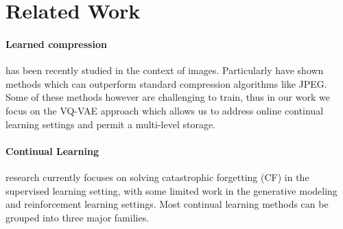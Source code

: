 \documentclass[colorinlistoftodos]{article} %
\begin{document}
				

 



\section{Related Work}

\paragraph{Learned compression} has been recently studied in the context of images. Particularly \citet{theis2017lossy,balle2016end,johnston2018improved} have shown methods which can outperform standard compression algorithms like JPEG. Some of these methods however are challenging to train, thus in our work we focus on the VQ-VAE approach \cite{van2017neural,razavi2019generating} which allows us to address online continual learning settings and permit a multi-level storage. 

\paragraph{Continual Learning} research currently focuses on  solving catastrophic forgetting (CF) in the supervised learning setting, with some limited work in the generative modeling and reinforcement learning settings. Most continual learning methods can be grouped into three major families. 
\end{document}
